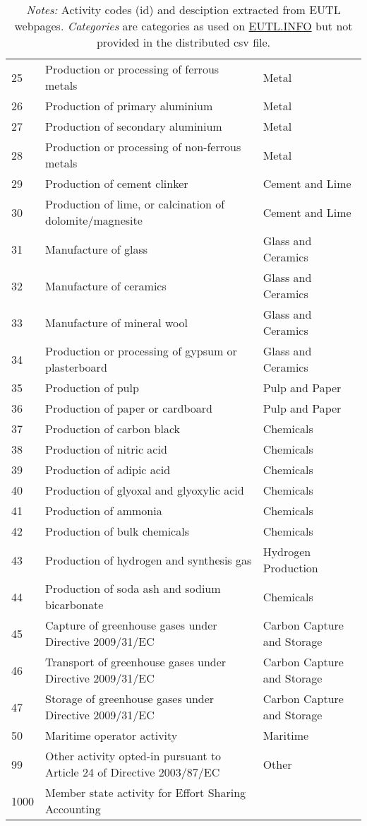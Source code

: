 \documentclass[authoryear]{elsarticle}
\begin{document}
\begin{table}[htbp]
\begin{tabular*}{\textwidth}{@{}@{\extracolsep{\fill}} lp{30.18em}l @{}}
		25    & Production or processing of ferrous metals & Metal \\
		26    & Production of primary aluminium & Metal \\
		27    & Production of secondary aluminium & Metal \\
		28    & Production or processing of non-ferrous metals & Metal \\
		29    & Production of cement clinker & Cement and Lime \\
		30    & Production of lime, or calcination of dolomite/magnesite & Cement and Lime \\
		31    & Manufacture of glass & Glass and Ceramics \\
		32    & Manufacture of ceramics & Glass and Ceramics \\
		33    & Manufacture of mineral wool & Glass and Ceramics \\
		34    & Production or processing of gypsum or plasterboard & Glass and Ceramics \\
		35    & Production of pulp & Pulp and Paper \\
		36    & Production of paper or cardboard & Pulp and Paper \\
		37    & Production of carbon black & Chemicals \\
		38    & Production of nitric acid & Chemicals \\
		39    & Production of adipic acid & Chemicals \\
		40    & Production of glyoxal and glyoxylic acid & Chemicals \\
		41    & Production of ammonia & Chemicals \\
		42    & Production of bulk chemicals & Chemicals \\
		43    & Production of hydrogen and synthesis gas & Hydrogen Production \\
		44    & Production of soda ash and sodium bicarbonate & Chemicals \\
		45    & Capture of greenhouse gases under Directive 2009/31/EC & Carbon Capture and Storage \\
		46    & Transport of greenhouse gases under Directive 2009/31/EC & Carbon Capture and Storage \\
		47    & Storage of greenhouse gases under Directive 2009/31/EC & Carbon Capture and Storage \\
		50    & Maritime operator activity & Maritime\\
		99	  & Other activity opted-in pursuant to Article 24 of Directive 2003/87/EC&	Other\\
		1000  & Member state activity for Effort Sharing Accounting&\\
		\bottomrule
		\bottomrule
	\end{tabular*}%
	\vspace{0ex}
	\caption*{\footnotesize \emph{Notes:} Activity codes (id) and desciption extracted from EUTL webpages. \emph{Categories} are categories as used on \href{https://euets.info}{EUTL.INFO} but not provided in the distributed csv file.}
	\vspace{0ex}
\end{table}%
\end{document}
